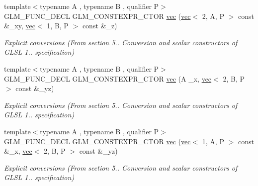 \begin{DoxyCompactItemize}
{\footnotesize template$<$typename A , typename B , qualifier P$>$ }\\G\+L\+M\+\_\+\+F\+U\+N\+C\+\_\+\+D\+E\+CL G\+L\+M\+\_\+\+C\+O\+N\+S\+T\+E\+X\+P\+R\+\_\+\+C\+T\+OR \hyperlink{structglm_1_1vec_3_013_00_01T_00_01Q_01_4_a800af9ada84dfb76714e279e81eb266e}{vec} (\hyperlink{structglm_1_1vec}{vec}$<$ 2, A, P $>$ const \&\+\_\+xy, \hyperlink{structglm_1_1vec}{vec}$<$ 1, B, P $>$ const \&\+\_\+z)
\begin{DoxyCompactList}\small\item\em Explicit conversions (From section 5.. Conversion and scalar constructors of G\+L\+SL 1.. specification) \end{DoxyCompactList}\item 
\mbox{\label{structglm_1_1vec_3_013_00_01T_00_01Q_01_4_a06a314f757e08eddfb46a1c759cf5c8e}} 
{\footnotesize template$<$typename A , typename B , qualifier P$>$ }\\G\+L\+M\+\_\+\+F\+U\+N\+C\+\_\+\+D\+E\+CL G\+L\+M\+\_\+\+C\+O\+N\+S\+T\+E\+X\+P\+R\+\_\+\+C\+T\+OR \hyperlink{structglm_1_1vec_3_013_00_01T_00_01Q_01_4_a06a314f757e08eddfb46a1c759cf5c8e}{vec} (A \+\_\+x, \hyperlink{structglm_1_1vec}{vec}$<$ 2, B, P $>$ const \&\+\_\+yz)
\begin{DoxyCompactList}\small\item\em Explicit conversions (From section 5.. Conversion and scalar constructors of G\+L\+SL 1.. specification) \end{DoxyCompactList}\item 
\mbox{\label{structglm_1_1vec_3_013_00_01T_00_01Q_01_4_a40cfee6d5aafeb1fe818ae483fad24a3}} 
{\footnotesize template$<$typename A , typename B , qualifier P$>$ }\\G\+L\+M\+\_\+\+F\+U\+N\+C\+\_\+\+D\+E\+CL G\+L\+M\+\_\+\+C\+O\+N\+S\+T\+E\+X\+P\+R\+\_\+\+C\+T\+OR \hyperlink{structglm_1_1vec_3_013_00_01T_00_01Q_01_4_a40cfee6d5aafeb1fe818ae483fad24a3}{vec} (\hyperlink{structglm_1_1vec}{vec}$<$ 1, A, P $>$ const \&\+\_\+x, \hyperlink{structglm_1_1vec}{vec}$<$ 2, B, P $>$ const \&\+\_\+yz)
\begin{DoxyCompactList}\small\item\em Explicit conversions (From section 5.. Conversion and scalar constructors of G\+L\+SL 1.. specification) \end{DoxyCompactList}\item 

\end{DoxyCompactItemize}
